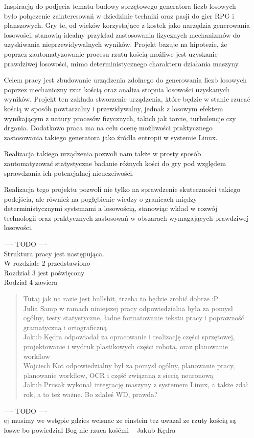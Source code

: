 Inspiracją do podjęcia tematu budowy sprzętowego generatora liczb losowych było połączenie zainteresowań w dziedzinie techniki oraz pasji do gier RPG i planszowych.
Gry te, od wieków korzystające z kostek jako narzędzia generowania losowości, stanowią idealny przykład zastosowania fizycznych mechanizmów do uzyskiwania nieprzewidywalnych wyników.
Projekt bazuje na hipotezie, że poprzez zautomatyzowanie procesu rzutu kością możliwe jest uzyskanie prawdziwej losowości, mimo deterministycznego charakteru działania maszyny.

Celem pracy jest zbudowanie urządzenia zdolnego do generowania liczb losowych poprzez mechaniczny rzut kością oraz analiza stopnia losowości uzyskanych wyników.
Projekt ten zakłada stworzenie urządzenia, które będzie w stanie rzucać kością w sposób powtarzalny i przewidywalny,
jednak z losowym efektem wynikającym z natury procesów fizycznych, takich jak tarcie, turbulencje czy drgania.
Dodatkowo praca ma na celu ocenę możliwości praktycznego zastosowania takiego generatora jako źródła entropii w systemie Linux.

Realizacja takiego urządzenia pozwoli nam także w prosty sposób zautomatyzować statystyczne badanie różnych kości do gry pod względem sprawdzania ich potencjalnej nieuczciwości.

Realizacja tego projektu pozwoli nie tylko na sprawdzenie skuteczności takiego podejścia,
ale również na pogłębienie wiedzy o granicach między deterministycznymi systemami a losowością,
stanowiąc wkład w rozwój technologii oraz praktycznych zastosowań w obszarach wymagających prawdziwej losowości.


---- TODO ---- \\
Struktura pracy jest następująca. \\
W rozdziale 2 przedstawiono \\
Rozdział 3 jest poświęcony \\
Rodział 4 zawiera \\


\begin{quote}
    Tutaj jak na razie jest bullshit, trzeba to będzie zrobić dobrze :P \\
    Julia Samp w ramach niniejszej pracy odpowiedzialna była za pomysł ogólny, testy statystyczne, ładne formatowanie tekstu pracy i poprawność gramatyczną i ortograficzną \\
    Jakub Kędra odpowiadał za opracowanie i realizację części sprzętowej, projektowanie i wydruk plastikowych części robota, oraz planowanie workflow \\
    Wojciech Kot odpowiedzialny był za pomysł ogólny, planowanie pracy, planowanie workflow, OCR i część związaną z siecią neuronową \\
    Jakub Prusak wykonał integrację maszyny z systemem Linux, a także zdał rok, a to też ważne. Bo zdałeś WD, prawda? \\
\end{quote}


---- TODO ---- \\
ej musimy we wstępie gdzies wcisnac ze einstein tez uwazal ze rzuty kością są loswe bo powiedzial Bog nie rzuca kośćmi ~ Jakub Kędra


